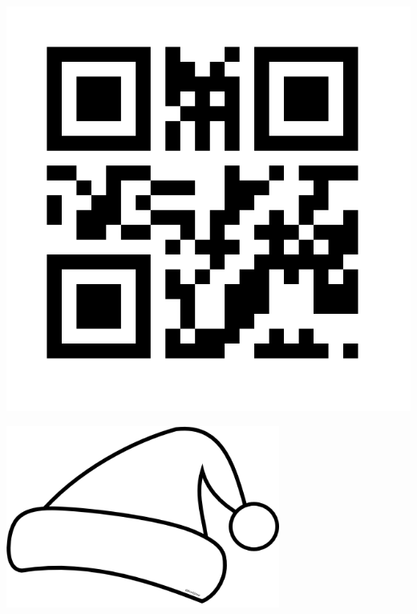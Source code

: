 \documentclass{article}
\begin{document}
\pagestyle{empty}
\begin{center}
\includegraphics[width=20cm]{bonnets_rouges}

\vspace{2cm}

\includegraphics[width=9cm]{bonnet}
\end{center}
\end{document}
